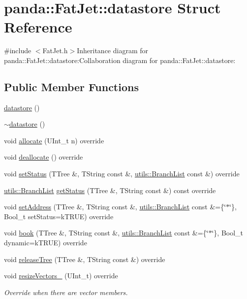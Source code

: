 \hypertarget{structpanda_1_1FatJet_1_1datastore}{
\section{panda::FatJet::datastore Struct Reference}
\label{structpanda_1_1FatJet_1_1datastore}
}


{\ttfamily \#include $<$FatJet.h$>$}Inheritance diagram for panda::FatJet::datastore:Collaboration diagram for panda::FatJet::datastore:\subsection*{Public Member Functions}
\begin{DoxyCompactItemize}
\item 
\hyperlink{structpanda_1_1FatJet_1_1datastore_a9705a085f7cb1355b03cbfff4f580dbf}{datastore} ()
\item 
\hyperlink{structpanda_1_1FatJet_1_1datastore_ab30c9e78310606976935325a55cb10e6}{$\sim$datastore} ()
\item 
void \hyperlink{structpanda_1_1FatJet_1_1datastore_a5df5d3f7ed3b3d1d70f99dcb6a9c25e4}{allocate} (UInt\_\-t n) override
\item 
void \hyperlink{structpanda_1_1FatJet_1_1datastore_ae981e60d6fc142e3bbb4730a8a856fa7}{deallocate} () override
\item 
void \hyperlink{structpanda_1_1FatJet_1_1datastore_a7c0b79a4a6e7875278841d4bc8a7deba}{setStatus} (TTree \&, TString const \&, \hyperlink{classpanda_1_1utils_1_1BranchList}{utils::BranchList} const \&) override
\item 
\hyperlink{classpanda_1_1utils_1_1BranchList}{utils::BranchList} \hyperlink{structpanda_1_1FatJet_1_1datastore_a83669574414333b1656878e0ec09c345}{getStatus} (TTree \&, TString const \&) const override
\item 
void \hyperlink{structpanda_1_1FatJet_1_1datastore_a0064ba6151edcef6eb9d4c5b6a9fdcf7}{setAddress} (TTree \&, TString const \&, \hyperlink{classpanda_1_1utils_1_1BranchList}{utils::BranchList} const \&=\{\char`\"{}$\ast$\char`\"{}\}, Bool\_\-t setStatus=kTRUE) override
\item 
void \hyperlink{structpanda_1_1FatJet_1_1datastore_abc4532c13b6be8b1feaf70e3504f5f59}{book} (TTree \&, TString const \&, \hyperlink{classpanda_1_1utils_1_1BranchList}{utils::BranchList} const \&=\{\char`\"{}$\ast$\char`\"{}\}, Bool\_\-t dynamic=kTRUE) override
\item 
void \hyperlink{structpanda_1_1FatJet_1_1datastore_a8dd1a45fedb7d5ec627601b23f0dc2d5}{releaseTree} (TTree \&, TString const \&) override
\item 
void \hyperlink{structpanda_1_1FatJet_1_1datastore_ac707315048c1fe184534202259fbdda9}{resizeVectors\_\-} (UInt\_\-t) override
\begin{DoxyCompactList}\small\item\em Override when there are vector members. \item\end{DoxyCompactList}\end{DoxyCompactItemize}


